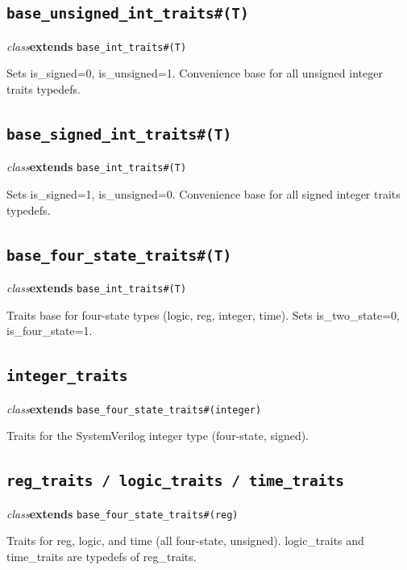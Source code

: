 \documentclass[11pt,letterpaper]{report}
\begin{document}
\subsection*{\texttt{base\_unsigned\_int\_traits\#(T)}}
\noindent\small\textit{class}\quad \textbf{extends} \texttt{base\_int\_traits\#(T)}\par

Sets is\_signed=0, is\_unsigned=1. Convenience base for all unsigned integer traits typedefs.


\subsection*{\texttt{base\_signed\_int\_traits\#(T)}}
\noindent\small\textit{class}\quad \textbf{extends} \texttt{base\_int\_traits\#(T)}\par

Sets is\_signed=1, is\_unsigned=0. Convenience base for all signed integer traits typedefs.


\subsection*{\texttt{base\_four\_state\_traits\#(T)}}
\noindent\small\textit{class}\quad \textbf{extends} \texttt{base\_int\_traits\#(T)}\par

Traits base for four-state types (logic, reg, integer, time). Sets is\_two\_state=0, is\_four\_state=1.


\subsection*{\texttt{integer\_traits}}
\noindent\small\textit{class}\quad \textbf{extends} \texttt{base\_four\_state\_traits\#(integer)}\par

Traits for the SystemVerilog integer type (four-state, signed).


\subsection*{\texttt{reg\_traits / logic\_traits / time\_traits}}
\noindent\small\textit{class}\quad \textbf{extends} \texttt{base\_four\_state\_traits\#(reg)}\par

Traits for reg, logic, and time (all four-state, unsigned). logic\_traits and time\_traits are typedefs of reg\_traits.
\end{document}
